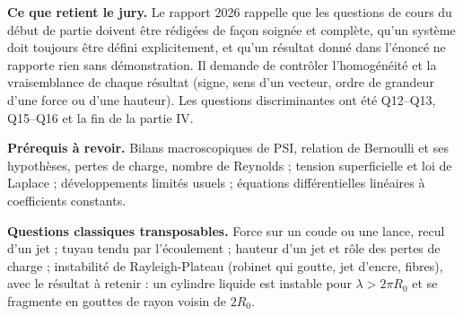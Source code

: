 \documentclass[11pt,a4paper]{article}
\begin{document}
\textbf{Ce que retient le jury.} Le rapport 2026 rappelle que les questions de cours du début de partie doivent être rédigées de façon soignée et complète, qu'un système doit toujours être défini explicitement, et qu'un résultat donné dans l'énoncé ne rapporte rien sans démonstration. Il demande de contrôler l'homogénéité et la vraisemblance de chaque résultat (signe, sens d'un vecteur, ordre de grandeur d'une force ou d'une hauteur). Les questions discriminantes ont été Q12--Q13, Q15--Q16 et la fin de la partie IV.

\textbf{Prérequis à revoir.} Bilans macroscopiques de PSI, relation de Bernoulli et ses hypothèses, pertes de charge, nombre de Reynolds ; tension superficielle et loi de Laplace ; développements limités usuels ; équations différentielles linéaires à coefficients constants.

\textbf{Questions classiques transposables.} Force sur un coude ou une lance, recul d'un jet ; tuyau tendu par l'écoulement ; hauteur d'un jet et rôle des pertes de charge ; instabilité de Rayleigh-Plateau (robinet qui goutte, jet d'encre, fibres), avec le résultat à retenir : un cylindre liquide est instable pour \(\lambda>2\pi R_0\) et se fragmente en gouttes de rayon voisin de \(2R_0\).
\end{document}

